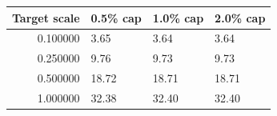 \begin{tabular}{rlll}
\hline
Target scale & 0.5\% cap & 1.0\% cap & 2.0\% cap \\
\hline
0.100000 & 3.65 & 3.64 & 3.64 \\
0.250000 & 9.76 & 9.73 & 9.73 \\
0.500000 & 18.72 & 18.71 & 18.71 \\
1.000000 & 32.38 & 32.40 & 32.40 \\
\hline
\end{tabular}
